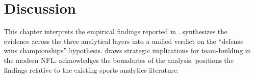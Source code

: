\chapter{Discussion}
\label{ch:discussion}

This chapter interprets the empirical findings reported in .  synthesizes the evidence across the three analytical layers into a unified verdict on the ``defense wins championships'' hypothesis.  draws strategic implications for team-building in the modern NFL.  acknowledges the boundaries of the analysis.  positions the findings relative to the existing sports analytics literature.





